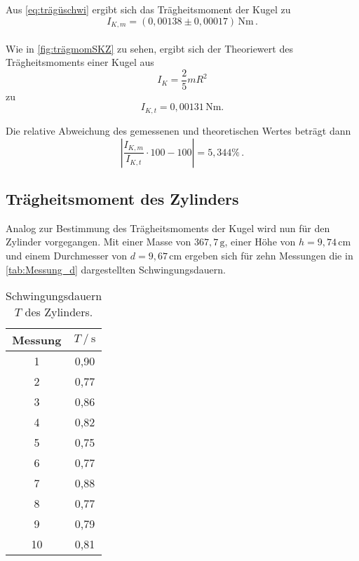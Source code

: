 Aus \eqref{eq:trägüschwi} ergibt sich das Trägheitsmoment der Kugel zu
\begin{equation*}
  I_{K,m} = (0,00138 \pm 0,00017)\, \unit{\newton\meter}  \, .
\end{equation*} \\

Wie in \autoref{fig:trägmomSKZ} zu sehen, ergibt sich der Theoriewert des Trägheitsmoments einer Kugel aus
\begin{equation}
  I_{K} = \frac{2}{5} m R^2
  \label{trägheitsmomK}
\end{equation}
zu
\begin{equation*}
  I_{K,t} = 0,00131 \, \unit{\newton\meter}. %
\end{equation*}

Die relative Abweichung des gemessenen und theoretischen Wertes beträgt dann
\begin{equation*}
  \left|\frac{I_{K,m}}{I_{K,t}} \cdot 100 - 100 \right| = 5,344 \% \,.
\end{equation*}



\subsection{Trägheitsmoment des Zylinders}
\label{subsec:d}

Analog zur Bestimmung des Trägheitsmoments der Kugel wird nun für den Zylinder vorgegangen. Mit einer Masse von $367,7 \,\unit{\gram}$, einer Höhe von $h = 9,74 \,\unit{\centi\meter}$
und einem Durchmesser von $d = 9,67 \,\unit{\centi\meter}$ ergeben sich für zehn Messungen die in \autoref{tab:Messung_d} dargestellten Schwingungsdauern.

\begin{table}[H]
  \centering
  \begin{tabular}{S[table-format=2.0] S[table-format=1.2]}
      \toprule
      {Messung} & {$T \mathbin{/} \unit{\second}$}\\
        & 0,90 \\
          2  & 0,77 \\
          3  & 0,86 \\
          4  & 0,82 \\  
          5  & 0,75 \\
          6  & 0,77 \\
          7  & 0,88 \\
          8  & 0,77 \\
          9  & 0,79 \\
          10 & 0,81 \\
      \bottomrule
  \end{tabular}
  \caption{Schwingungsdauern $T$ des Zylinders.}
  \label{tab:Messung_d}
\end{table}

